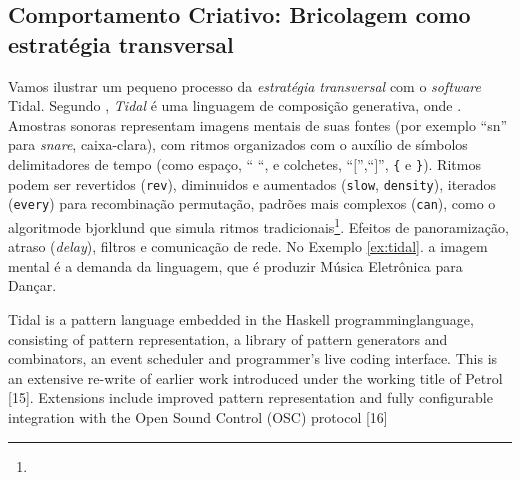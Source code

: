  
\subsection{Comportamento Criativo: Bricolagem como estratégia transversal}\label{sec:tidal}

Vamos ilustrar um pequeno processo da \emph{estratégia transversal} com o \emph{software} Tidal.
Segundo , \emph{Tidal} é uma linguagem de composição generativa, onde . Amostras sonoras representam imagens mentais de suas fontes (por exemplo ``sn'' para \emph{snare}, caixa-clara), com ritmos organizados com o auxílio de símbolos delimitadores de tempo (como espaço, `` ``, e colchetes, ``$[$'',``$]$'', \verb|{| e \verb|}|). Ritmos podem ser revertidos (\verb|rev|), diminuidos e aumentados (\verb|slow|, \verb|density|), iterados (\verb|every|) para recombinação permutação, padrões mais complexos (\verb|can|), como o algoritmode bjorklund que simula ritmos tradicionais\footnote{}. Efeitos de panoramização, atraso (\emph{delay}), filtros e comunicação de rede. No Exemplo \ref{ex:tidal}. a imagem mental é a demanda da linguagem, que é produzir Música Eletrônica para Dançar.

\begin{citacao}
{Tidal is a pattern language embedded in the Haskell programminglanguage, consisting of pattern representation, a library of pattern generators and combinators, an event scheduler and programmer’s live coding interface. This is an extensive re-write of earlier work introduced under the working title of Petrol [15]. Extensions include improved pattern representation and fully configurable integration with the Open Sound Control (OSC) protocol [16]
}
\end{citacao}

